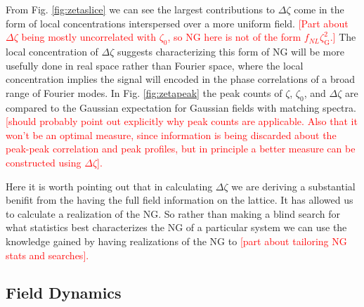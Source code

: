 From Fig. \ref{fig:zetaslice} we can see the largest contributions to $\Delta\zeta$ come in the form of local concentrations interspersed over a more uniform field. \textcolor{red}{[Part about $\Delta\zeta$ being mostly uncorrelated with $\zeta_0$, so NG here is not of the form $f_{NL}\zeta_\mathrm{G}^2$.]} The local concentration of $\Delta\zeta$ suggests characterizing this form of NG will be more usefully done in real space rather than Fourier space, where the local concentration implies the signal will encoded in the phase correlations of a broad range of Fourier modes. In Fig. \ref{fig:zetapeak} the peak counts of $\zeta$, $\zeta_0$, and $\Delta\zeta$ are compared to the Gaussian expectation for Gaussian fields with matching spectra. \textcolor{red}{[should probably point out explicitly why peak counts are applicable. Also that it won't be an optimal measure, since information is being discarded about the peak-peak correlation and peak profiles, but in principle a better measure can be constructed using $\Delta\zeta$].}

Here it is worth pointing out that in calculating $\Delta\zeta$ we are deriving a substantial benifit from the having the full field information on the lattice. It has allowed us to calculate a realization of the NG. So rather than making a blind search for what statistics best characterizes the NG of a particular system we can use the knowledge gained by having realizations of the NG to \textcolor{red}{[part about tailoring NG stats and searches].}



\Fzetaslice
\Fzetapeak


\subsection{Field Dynamics} \label{sec:field dynamics}


